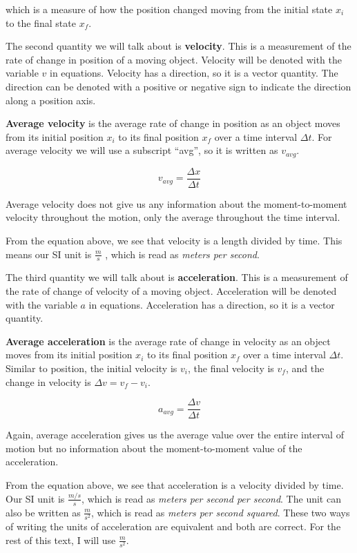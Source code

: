 \documentclass[12pt]{book}
\begin{document}
which is a measure of how the position changed moving from the initial state $x_i$ to the final state $x_f$. 

The second quantity we will talk about is \textbf{velocity}. This is a measurement of the rate of change in position of a moving object.  Velocity will be denoted with the variable $v$ in equations. Velocity has a direction, so it is a vector quantity. The direction can be denoted with a positive or negative sign to indicate the direction along a position axis.

\textbf{Average velocity} is the average rate of change in position as an object moves from its initial position $x_i$ to its final position $x_f$ over a time interval $\Delta t$. For average velocity we will use a subscript ``avg'', so it is written as $v_{avg}$. 

\begin{equation}
v_{avg} = \frac{\Delta x}{\Delta t}
\end{equation}

Average velocity does not give us any information about the moment-to-moment velocity throughout the motion, only the average throughout the time interval.

From the equation above, we see that velocity is a length divided by time. This means our SI unit is $\frac{m}{s}$ , which is read as \textit{meters per second}. 

The third quantity we will talk about is \textbf{acceleration}. This is a measurement of the rate of change of velocity of a moving object. Acceleration will be denoted with the variable $a$ in equations. Acceleration has a direction, so it is a vector quantity. 

\textbf{Average acceleration} is the average rate of change in velocity as an object moves from its initial position $x_i$ to its final position $x_f$ over a time interval $\Delta t$. Similar to position, the initial velocity is $v_i$, the final velocity is $v_f$, and the change in velocity is $\Delta v = v_f - v_i$.

\begin{equation}
a_{avg} = \frac{\Delta v}{\Delta t}
\end{equation}

Again, average acceleration gives us the average value over the entire interval of motion but no information about the moment-to-moment value of the acceleration.

From the equation above, we see that acceleration is a velocity divided by time. Our SI unit is $\frac{m/s}{s}$, which is read as \textit{meters per second per second}. The unit can also be written as $\frac{m}{s^2}$, which is read as \textit{meters per second squared}. These two ways of writing the units of acceleration are equivalent and both are correct. For the rest of this text, I will use $\frac{m}{s^2}$.
\end{document}
